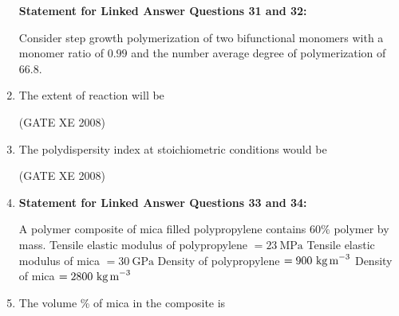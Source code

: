 \documentclass[12pt]{article}
\begin{document}
\begin{enumerate}
\textbf{Statement for Linked Answer Questions 31 and 32:}  

 Consider step growth polymerization of two bifunctional monomers with a monomer ratio of $0.99$ and the number average degree of polymerization of $66.8$.

\item The extent of reaction will be  

\begin{enumerate}
\end{enumerate}

(GATE XE 2008)

\item The polydispersity index at stoichiometric conditions would be  

\begin{enumerate}
\end{enumerate}

(GATE XE 2008)


\item[]

\textbf{Statement for Linked Answer Questions 33 and 34:}  

A polymer composite of mica filled polypropylene contains $60\%$ polymer by mass.  
Tensile elastic modulus of polypropylene $= 23\ \text{MPa}$  
Tensile elastic modulus of mica $= 30\ \text{GPa}$  
Density of polypropylene $= 900\ \text{kg\,m}^{-3}$  
Density of mica $= 2800\ \text{kg\,m}^{-3}$

\item The volume \% of mica in the composite is  

\begin{enumerate}
\end{enumerate}


\end{enumerate}
\end{document}
